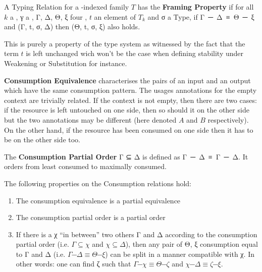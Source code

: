 \begin{definition}A Typing Relation \TR{\cdot{}} for a \Nat{}-indexed
family $T$ has the \textbf{Framing Property} if for all $k$ a \Nat{},
γ a , Γ, Δ, Θ, ξ four , $t$ an element
of $T_k$ and σ a Type, if \mbox{Γ ─ Δ ≡ Θ ─ ξ} and (Γ, t, σ, Δ)
then (Θ, t, σ, ξ) also holds.
\end{definition}

\begin{remark}This is purely a property of the type system as
witnessed by the fact that the term $t$ is left unchanged wich
won't be the case when defining stability under Weakening or
Substitution for instance.
\end{remark}


\begin{definition}
\label{definition:differences}
\textbf{Consumption Equivalence} characterises the pairs of an input and
an output \Usages{} which have the same consumption pattern. The
usages annotations for the empty context are trivially related.
If the context is not empty, then there are two cases: if the
resource is left untouched on one side, then so should it on the other
side but the two annotations may be different (here denoted $A$ and $B$
respectively). On the other hand, if the resource has been consumed
on one side then it has to be on the other side too.
\end{definition}

\begin{definition}The \textbf{Consumption Partial Order} Γ ⊆ Δ is defined as
\mbox{Γ ─ Δ ≡ Γ ─ Δ}. It orders \Usages{} from least consumed to maximally consumed.
\end{definition}

\begin{lemma} The following properties on the Consumption relations hold:
\begin{enumerate}
  \item The consumption equivalence is a partial equivalence~\cite{mitchell1996foundations}
  \item The consumption partial order is a partial order
  \item If there is a \Usages{} χ ``in between'' two others Γ and Δ according to
        the consumption partial order (i.e. $Γ ⊆ χ$ and $χ ⊆ Δ$), then any pair
        of \Usages{} Θ, ξ consumption equal to Γ and Δ (i.e. \mbox{$Γ ─ Δ ≡ Θ ─ ξ$})
        can be split in a manner compatible with χ. In other words: one can find
        ζ such that \mbox{$Γ ─ χ ≡ Θ ─ ζ$} and \mbox{$χ ─ Δ ≡ ζ ─ ξ$}.
\end{enumerate}
\end{lemma}

